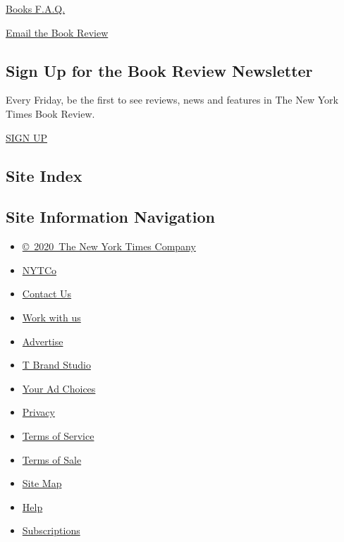 \href{https://www.nytimes.com/membercenter/faq/books.html?ref=review}{Books
F.A.Q.}

\href{mailto:books@nytimes.com}{Email the Book Review}

\hypertarget{sign-up-for-the-book-review-newsletter}{%
\subsection{Sign Up for the Book Review
Newsletter}\label{sign-up-for-the-book-review-newsletter}}

Every Friday, be the first to see reviews, news and features in The New
York Times Book Review.

\href{/newsletters/signup/BK}{SIGN UP}

\hypertarget{site-index}{%
\subsection{Site Index}\label{site-index}}

\hypertarget{site-information-navigation}{%
\subsection{Site Information
Navigation}\label{site-information-navigation}}

\begin{itemize}
\tightlist
\item
  \href{https://help.nytimes.com/hc/en-us/articles/115014792127-Copyright-notice}{©~2020~The
  New York Times Company}
\end{itemize}

\begin{itemize}
\tightlist
\item
  \href{https://www.nytco.com/}{NYTCo}
\item
  \href{https://help.nytimes.com/hc/en-us/articles/115015385887-Contact-Us}{Contact
  Us}
\item
  \href{https://www.nytco.com/careers/}{Work with us}
\item
  \href{https://nytmediakit.com/}{Advertise}
\item
  \href{http://www.tbrandstudio.com/}{T Brand Studio}
\item
  \href{https://www.nytimes.com/privacy/cookie-policy\#how-do-i-manage-trackers}{Your
  Ad Choices}
\item
  \href{https://www.nytimes.com/privacy}{Privacy}
\item
  \href{https://help.nytimes.com/hc/en-us/articles/115014893428-Terms-of-service}{Terms
  of Service}
\item
  \href{https://help.nytimes.com/hc/en-us/articles/115014893968-Terms-of-sale}{Terms
  of Sale}
\item
  \href{https://spiderbites.nytimes.com}{Site Map}
\item
  \href{https://help.nytimes.com/hc/en-us}{Help}
\item
  \href{https://www.nytimes.com/subscription?campaignId=37WXW}{Subscriptions}
\end{itemize}

